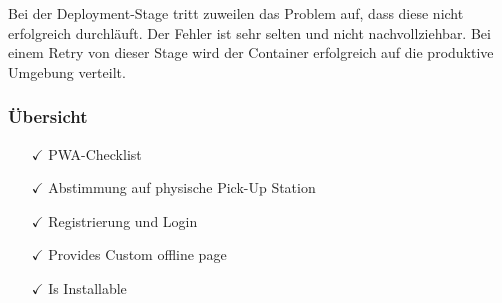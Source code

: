 Bei der Deployment-Stage tritt zuweilen das Problem auf, dass diese nicht erfolgreich durchläuft. Der Fehler ist sehr selten und nicht nachvollziehbar. Bei einem Retry von dieser Stage wird der Container erfolgreich auf die produktive Umgebung verteilt. 

\subsubsection{Übersicht}
\begin{itemize}
	\item [{$\checkmark$}] PWA-Checklist
	\item [{$\checkmark$}] Abstimmung auf physische Pick-Up Station
	\item [{$\checkmark$}] Registrierung und Login
	\item [{$\checkmark$}] Provides Custom offline page
	\item [{$\checkmark$}] Is Installable
\end{itemize}
\newpage